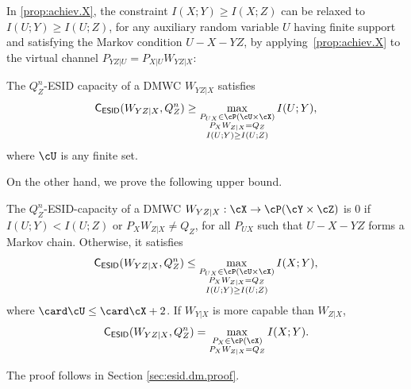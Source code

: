 \documentclass[conference,final]{IEEEtran}
\begin{document}
In \cref{prop:achiev.X}, the constraint $I(X; Y) \ge I(X; Z)$
can be relaxed to $I(U; Y) \ge I(U; Z)$,
for any auxiliary random variable $U$ having finite support and
satisfying the Markov condition $U - X - YZ$,
by applying~\cref{prop:achiev.X} to the virtual channel
$P_{YZ|U} = P_{X|U} W_{YZ|X}$:
\begin{corollary}
  The $Q_Z^n$-ESID capacity of a DMWC $W_{YZ|X}$ satisfies
  \begin{gather}
  \label{eq:achiev.U}
    \capESID(W_{YZ|X}, Q_Z^n)
    \ge
      \max_{\substack{
        P_{UX} \in \cP(\cU \times \cX)
        \\ P_X W_{Z|X} = Q_Z
        \\ I(U; Y) \ge I(U; Z)
      }}
      I(U; Y),
  \end{gather}
  \label{corollary:achiev.U}
  where $\cU$ is any finite set.
\end{corollary}
On the other hand, we prove the following upper bound.
\begin{theorem}
  \label{thm:esid.dm}
  The $Q_Z^n$-ESID-capacity of a DMWC $W_{YZ|X} : \cX \to \cP(\cY \times \cZ)$
  is $0$ if $I(U; Y) < I(U; Z)$ or $P_X W_{Z|X} \ne Q_Z$, for all $P_{UX}$ such that
  $U - X - YZ$ forms a Markov chain. Otherwise, it
  satisfies
  \begin{gather}
  \label{eq:esid.dm}
    \capESID(W_{YZ|X}, Q_Z^n) \le
    \max_{\substack{
      P_{UX} \in \cP(\cU \times \cX)
      \\ P_X W_{Z|X} = Q_Z
      \\ I(U; Y) \ge I(U; Z)
    }}
    I(X; Y),
\end{gather}
  where $\card\cU \le \card\cX + 2$.
  If $W_{Y|X}$ is more capable than $W_{Z|X}$,
  \begin{gather}
    \capESID(W_{YZ|X}, Q_Z^n) =
    \max_{\substack{
      P_X \in \cP(\cX)
      \\ P_X W_{Z|X} = Q_Z
    }}
    I(X; Y).
  \end{gather}
\end{theorem}
The proof follows in Section \ref{sec:esid.dm.proof}.
\end{document}
